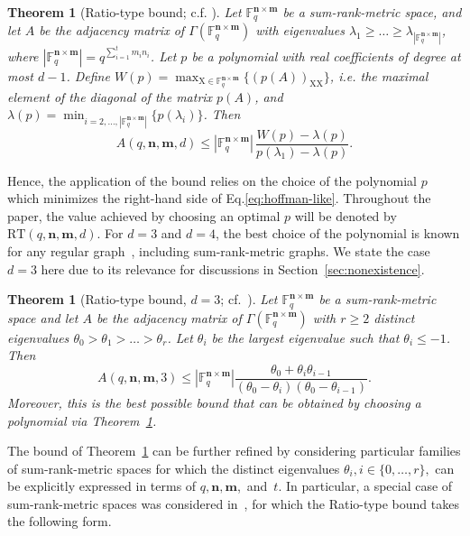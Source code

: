 \documentclass[a4paper]{article}
\newtheorem{theorem}[formula]{Theorem}
\newcommand{\F}{\mathbb{F}}
\newcommand{\bfn}{\mathbf {n}}
\newcommand{\bfm}{\mathbf {m}}
\newcommand{\spac}{\F^{\bfn\times\bfm}_q}
\begin{document}
\begin{theorem}[Ratio-type bound; c.f. \cite{ACF2019,AKR2024}]\label{thm:hoffman-like} Let $\spac$ be a sum-rank-metric space, and let $A$ be the adjacency matrix of $\Gamma(\spac)$ with eigenvalues \mbox{$\lambda_1\geq\dots\geq\lambda_{|\spac|}$,} where $|\spac|=q^{\sum_{i=1}^t m_in_i}$. Let $p$ be a polynomial with real coefficients of degree at most $d-1$. Define \mbox{$W(p)=\max_{\mathrm{X}\in \spac}\{(p(A))_{\mathrm{X}\mathrm{X}}\}$}, i.e. the maximal element of the diagonal of the matrix $p(A)$, and\\ \mbox{$\lambda(p)=\min_{i=2,\dots,|\spac|}\{p(\lambda_i)\}$.} Then
\begin{equation}\label{eq:hoffman-like}
    A(q,\bfn,\bfm,d) \leq |\spac| \, \frac{W(p)-\lambda(p)}{p(\lambda_1)-\lambda(p)}.
\end{equation}
\end{theorem}

Hence, the application of the bound relies on the choice of the polynomial $p$ which minimizes the right-hand side of Eq.\:\eqref{eq:hoffman-like}. Throughout the paper, the value achieved by choosing an optimal $p$ will be denoted by $\mathrm{RT}(q,\bfn,\bfm,d)$. For $d=3$ and $d=4$, the best choice of the polynomial is known for any regular graph~\cite{ACF2019,KN2022}, including sum-rank-metric graphs. We state the case $d=3$ here due to its relevance for discussions in Section~\ref{sec:nonexistence}.

\begin{theorem}[Ratio-type bound, $d=3$; cf.~\cite{ACF2019}]\label{thm:hoffman-k=2} 
Let $\spac$ be a sum-rank-metric space and let $A$ be the adjacency matrix of $\Gamma(\spac)$ with $r\geq 2$ distinct eigenvalues \mbox{$\theta_0>\theta_1>\dots>\theta_r$}. Let $\theta_i$ be the largest eigenvalue such that $\theta_i\leq -1$. Then $$A(q,\bfn,\bfm,3)\leq |\spac|\frac{\theta_0+\theta_i\theta_{i-1}}{(\theta_0-\theta_i)(\theta_0-\theta_{i-1})}.$$ Moreover, this is the best possible bound that can be obtained by choosing a polynomial via Theorem~\ref{thm:hoffman-like}.    
\end{theorem}

The bound of Theorem~\ref{thm:hoffman-k=2} can be further refined by considering particular families of sum-rank-metric spaces for which the distinct eigenvalues $\theta_i,i\in\{0,\dots,r\},$ can be explicitly expressed in terms of $q,\bfn,\bfm$,~and~$t$. In particular, a special case of sum-rank-metric spaces was considered in~\cite{AKR2024}, for which the Ratio-type bound takes the following form.
\end{document}
